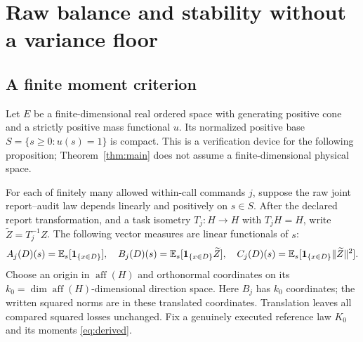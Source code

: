\section{Raw balance and stability without a variance floor}
\subsection*{A finite moment criterion}
Let $E$ be a finite-dimensional real ordered space with generating positive cone and a strictly positive mass functional $u$. Its normalized positive base $S=\{s\ge0:u(s)=1\}$ is compact. This is a verification device for the following proposition; Theorem~\ref{thm:main} does not assume a finite-dimensional physical space.

For each of finitely many allowed within-call commands $j$, suppose the raw joint report--audit law depends linearly and positively on $s\in S$. After the declared report transformation, and a task isometry $T_j:H\to H$ with $T_jH=H$, write $\widetilde Z=T_j^{-1}Z$. The following vector measures are linear functionals of $s$:
\[
 A_j(D)(s)=\mathbb E_s[\mathbf1_{\{x\in D\}}],\quad
 B_j(D)(s)=\mathbb E_s[\mathbf1_{\{x\in D\}}\widetilde Z],\quad
 C_j(D)(s)=\mathbb E_s[\mathbf1_{\{x\in D\}}\|\widetilde Z\|^2].
\]
Choose an origin in $\operatorname{aff}(H)$ and orthonormal coordinates on its $k_0=\dim\operatorname{aff}(H)$-dimensional direction space. Here $B_j$ has $k_0$ coordinates; the written squared norms are in these translated coordinates. Translation leaves all compared squared losses unchanged. Fix a genuinely executed reference law $K_0$ and its moments \eqref{eq:derived}.


